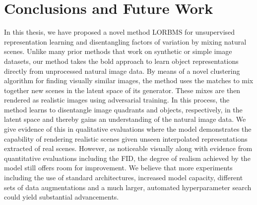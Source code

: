 \documentclass[a4paper,12pt]{report}
\begin{document}
\chapter{Conclusions and Future Work}\label{sec:conclusion}


In this thesis, we have proposed a novel method LORBMS for unsupervised representation learning and disentangling factors of variation by mixing natural scenes. Unlike many prior methods that work on synthetic or simple image datasets, our method takes the bold approach to learn object representations directly from unprocessed natural image data. By means of a novel clustering algorithm for finding visually similar images, the method uses the matches to mix together new scenes in the latent space of its generator. These mixes are then rendered as realistic images using adversarial training. In this process, the method learns to disentangle image quadrants and objects, respectively, in the latent space and thereby gains an understanding of the natural image data. We give evidence of this in qualitative evaluations where the model demonstrates the capability of rendering realistic scenes given unseen interpolated representations extracted of real scenes. However, as noticeable visually along with evidence from quantitative evaluations including the FID, the degree of realism achieved by the model still offers room for improvement. We believe that more experiments including the use of standard architectures, increased model capacity, different sets of data augmentations and a much larger, automated hyperparameter search could yield substantial advancements. 
\end{document}
